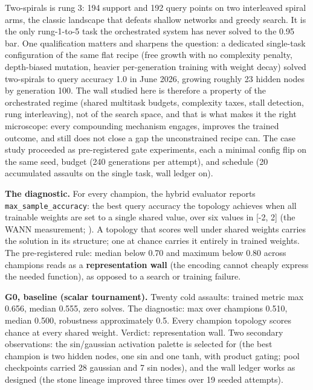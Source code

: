 \documentclass[11pt]{article}
\begin{document}
Two-spirals \citep{lang1988, fahlman1990} is rung 3: 194 support and 192 query points on two interleaved spiral arms, the classic landscape that defeats shallow networks and greedy search. It is the only rung-1-to-5 task the orchestrated system has never solved to the 0.95 bar. One qualification matters and sharpens the question: a dedicated single-task configuration of the same flat recipe (free growth with no complexity penalty, depth-biased mutation, heavier per-generation training with weight decay) solved two-spirals to query accuracy 1.0 in June 2026, growing roughly 23 hidden nodes by generation 100. The wall studied here is therefore a property of the orchestrated regime (shared multitask budgets, complexity taxes, stall detection, rung interleaving), not of the search space, and that is what makes it the right microscope: every compounding mechanism engages, improves the trained outcome, and still does not close a gap the unconstrained recipe can. The case study proceeded as pre-registered gate experiments, each a minimal config flip on the same seed, budget (240 generations per attempt), and schedule (20 accumulated assaults on the single task, wall ledger on).

\textbf{The diagnostic.} For every champion, the hybrid evaluator reports \texttt{max_sample_accuracy}: the best query accuracy the topology achieves when all trainable weights are set to a single shared value, over six values in [-2, 2] (the WANN measurement; \citealp{gaier2019}). A topology that scores well under shared weights carries the solution in its structure; one at chance carries it entirely in trained weights. The pre-registered rule: median below 0.70 and maximum below 0.80 across champions reads as a \textbf{representation wall} (the encoding cannot cheaply express the needed function), as opposed to a search or training failure.

\textbf{G0, baseline (scalar tournament).} Twenty cold assaults: trained metric max 0.656, median 0.555, zero solves. The diagnostic: max over champions 0.510, median 0.500, robustness approximately 0.5. Every champion topology scores chance at every shared weight. Verdict: representation wall. Two secondary observations: the sin/gaussian activation palette is selected for (the best champion is two hidden nodes, one sin and one tanh, with product gating; pool checkpoints carried 28 gaussian and 7 sin nodes), and the wall ledger works as designed (the stone lineage improved three times over 19 seeded attempts).
\end{document}
